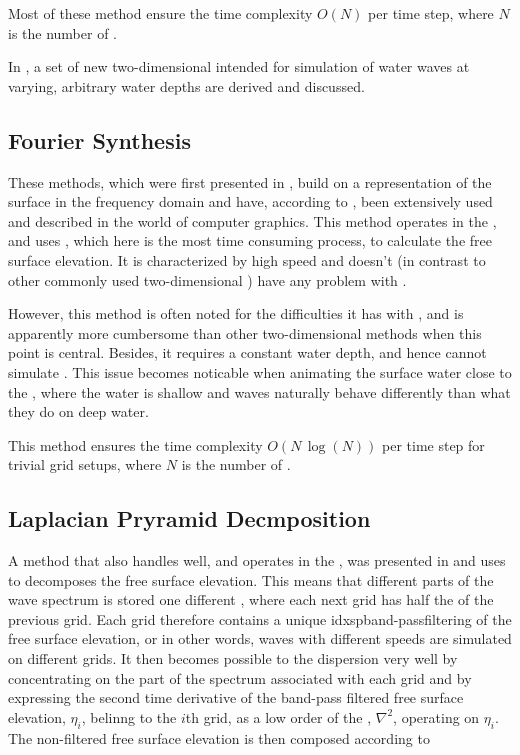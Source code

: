 Most of these method ensure the time complexity $O(N)$ per time step, where $N$ is the number of .

In , a set of new two-dimensional \PDEs intended for simulation of water waves at varying, arbitrary water depths are derived and discussed.

\subsection{Fourier Synthesis}

These methods, which were first presented in \citep{Mastin1987}, build on  a representation of the surface in the frequency domain and have, according to \citep{Monnier}, been extensively used and described in the world of computer graphics. This method operates in the , and uses \FFT, which here is the most time consuming process, to calculate the free surface elevation. It is characterized by high speed and doesn't (in contrast to other commonly used two-dimensional \PDEs) have any problem with .

However, this method is often noted for the difficulties it has with \FSI, and is apparently more cumbersome than other two-dimensional methods when this point is central. Besides, it requires a constant water depth, and hence cannot simulate . This issue becomes noticable when animating the surface water close to the , where the water is shallow and waves naturally behave differently than what they do on deep water.

This method ensures the time complexity $O(N\,\log(N))$ per time step for trivial grid setups, where $N$ is the number of .

\subsection{Laplacian Pryramid Decmposition}

A method that also handles  well, and operates in the , was presented in \citep{Ottosson2011} and uses \LPD to decomposes the free surface elevation. This means that different parts of the wave spectrum is stored one different \grids, where each next grid has half the \resolution of the previous grid. Each grid therefore contains a unique idxsp{band-pass}{filter}{ing} of the free surface elevation, or in other words, waves with different speeds are simulated on different grids. It then becomes possible to \approximate the dispersion very well by concentrating on the part of the spectrum associated with each grid and by expressing the second time derivative of the band-pass filtered free surface elevation, $\eta_i$, belinng to the $i$th grid, as a low order \polynomial of the , $\nabla^2$, operating on $\eta_i$. The non-filtered free surface elevation is then composed according to

